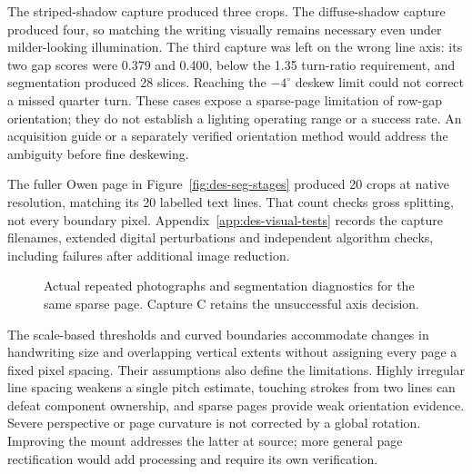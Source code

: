 The striped-shadow capture produced three crops. The diffuse-shadow capture produced four, so matching the writing visually remains necessary even under milder-looking illumination. The third capture was left on the wrong line axis: its two gap scores were 0.379 and 0.400, below the 1.35 turn-ratio requirement, and segmentation produced 28 slices. Reaching the $-4^\circ$ deskew limit could not correct a missed quarter turn. These cases expose a sparse-page limitation of row-gap orientation; they do not establish a lighting operating range or a success rate. An acquisition guide or a separately verified orientation method would address the ambiguity before fine deskewing.

The fuller Owen page in Figure~\ref{fig:des-seg-stages} produced 20 crops at native resolution, matching its 20 labelled text lines. That count checks gross splitting, not every boundary pixel. Appendix~\ref{app:des-visual-tests} records the capture filenames, extended digital perturbations and independent algorithm checks, including failures after additional image reduction.
\begin{figure}[!htbp]\centering
{}
\caption{Actual repeated photographs and segmentation diagnostics for the same sparse page. Capture C retains the unsuccessful axis decision.}
\label{fig:des-seg-variation}
\end{figure}

The scale-based thresholds and curved boundaries accommodate changes in handwriting size and overlapping vertical extents without assigning every page a fixed pixel spacing. Their assumptions also define the limitations. Highly irregular line spacing weakens a single pitch estimate, touching strokes from two lines can defeat component ownership, and sparse pages provide weak orientation evidence. Severe perspective or page curvature is not corrected by a global rotation. Improving the mount addresses the latter at source; more general page rectification would add processing and require its own verification.
\FloatBarrier
